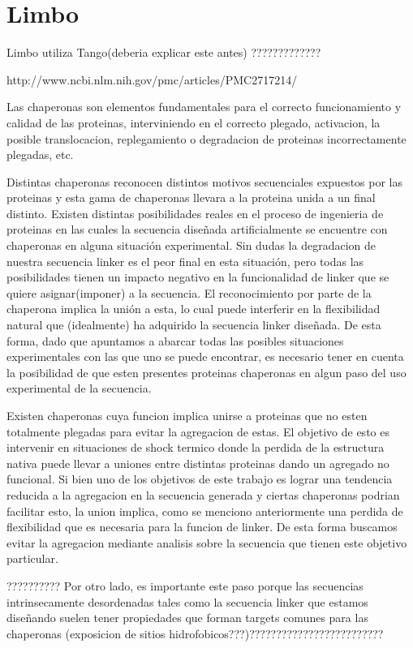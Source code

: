 \section{Limbo}

Limbo utiliza Tango(deberia explicar este antes) ?????????????

http://www.ncbi.nlm.nih.gov/pmc/articles/PMC2717214/

Las chaperonas son elementos fundamentales para el correcto funcionamiento y calidad de las proteinas, interviniendo en el correcto plegado, activacion, la posible translocacion, replegamiento o degradacion de proteinas incorrectamente plegadas, etc.

Distintas chaperonas reconocen distintos motivos secuenciales expuestos por las proteinas y esta gama de chaperonas llevara a la proteina unida a un final distinto.
Existen distintas posibilidades reales en el proceso de ingenieria de proteinas en las cuales la secuencia diseñada artificialmente se encuentre con chaperonas en alguna situación experimental. Sin dudas la degradacion de nuestra secuencia linker es el peor final en esta situación, pero todas las posibilidades tienen un impacto negativo en la funcionalidad de linker que se quiere asignar(imponer) a la secuencia. El reconocimiento por parte de la chaperona implica la unión a esta, lo cual puede interferir en la flexibilidad natural que (idealmente) ha adquirido la secuencia linker diseñada. 
De esta forma, dado que apuntamos a abarcar todas las posibles situaciones experimentales con las que uno se puede encontrar, es necesario tener en cuenta la posibilidad de que esten presentes proteinas chaperonas en algun paso del uso experimental de la secuencia. 
 
Existen chaperonas cuya funcion implica unirse a proteinas que no esten totalmente plegadas para evitar la agregacion de estas. El objetivo de esto es intervenir en situaciones de shock termico donde la perdida de la estructura nativa puede llevar a uniones entre distintas proteinas dando un agregado no funcional. Si bien uno de los objetivos de este trabajo es lograr una tendencia reducida a la agregacion en la secuencia generada y ciertas chaperonas podrian facilitar esto, la union implica, como se menciono anteriormente una perdida de flexibilidad que es necesaria para la funcion de linker. De esta forma buscamos evitar la agregacion mediante analisis sobre la secuencia que tienen este objetivo particular.

??????????
Por otro lado, es importante este paso porque las secuencias intrinsecamente desordenadas tales como la secuencia linker que estamos diseñando suelen tener propiedades que forman targets comunes para las chaperonas (exposicion de sitios hidrofobicos???)?????????????????????????


